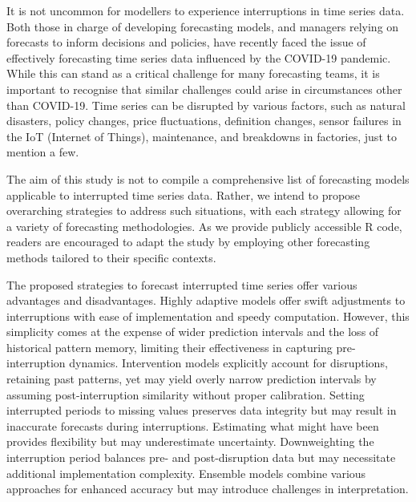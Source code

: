 \documentclass[
  11pt,
  a4paper,
]{article}
\begin{document}
It is not uncommon for modellers to experience interruptions in time
series data. Both those in charge of developing forecasting models, and
managers relying on forecasts to inform decisions and policies, have
recently faced the issue of effectively forecasting time series data
influenced by the COVID-19 pandemic. While this can stand as a critical
challenge for many forecasting teams, it is important to recognise that
similar challenges could arise in circumstances other than COVID-19.
Time series can be disrupted by various factors, such as natural
disasters, policy changes, price fluctuations, definition changes,
sensor failures in the IoT (Internet of Things), maintenance, and
breakdowns in factories, just to mention a few.

The aim of this study is not to compile a comprehensive list of
forecasting models applicable to interrupted time series data. Rather,
we intend to propose overarching strategies to address such situations,
with each strategy allowing for a variety of forecasting methodologies.
As we provide publicly accessible R code, readers are encouraged to
adapt the study by employing other forecasting methods tailored to their
specific contexts.

The proposed strategies to forecast interrupted time series offer
various advantages and disadvantages. Highly adaptive models offer swift
adjustments to interruptions with ease of implementation and speedy
computation. However, this simplicity comes at the expense of wider
prediction intervals and the loss of historical pattern memory, limiting
their effectiveness in capturing pre-interruption dynamics. Intervention
models explicitly account for disruptions, retaining past patterns, yet
may yield overly narrow prediction intervals by assuming
post-interruption similarity without proper calibration. Setting
interrupted periods to missing values preserves data integrity but may
result in inaccurate forecasts during interruptions. Estimating what
might have been provides flexibility but may underestimate uncertainty.
Downweighting the interruption period balances pre- and post-disruption
data but may necessitate additional implementation complexity. Ensemble
models combine various approaches for enhanced accuracy but may
introduce challenges in interpretation.
\end{document}
